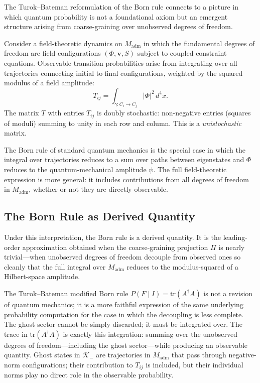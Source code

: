 \documentclass[12pt,a4paper]{article}
\theoremstyle{remark}
\begin{document}
The Turok--Bateman reformulation of the Born rule connects to a picture in
which quantum probability is not a foundational axiom but an emergent
structure arising from coarse-graining over unobserved degrees of freedom.

Consider a field-theoretic dynamics on $M_{\mathrm{adm}}$ in which the
fundamental degrees of freedom are field configurations $(\Phi,\mathbf{v},S)$
subject to coupled constraint equations. Observable transition probabilities
arise from integrating over all trajectories connecting initial to final
configurations, weighted by the squared modulus of a field amplitude:
\begin{equation}
  T_{ij} = \int_{\gamma : C_i \to C_j} |\Phi|^2\,d^4x.
\end{equation}
The matrix $T$ with entries $T_{ij}$ is doubly stochastic: non-negative
entries (squares of moduli) summing to unity in each row and column. This
is a \emph{unistochastic} matrix.

The Born rule of standard quantum mechanics is the special case in which
the integral over trajectories reduces to a sum over paths between
eigenstates and $\Phi$ reduces to the quantum-mechanical amplitude $\psi$.
The full field-theoretic expression is more general: it includes contributions
from all degrees of freedom in $M_{\mathrm{adm}}$, whether or not they are
directly observable.

\subsection{The Born Rule as Derived Quantity}

Under this interpretation, the Born rule is a derived quantity. It is the
leading-order approximation obtained when the coarse-graining projection
$\Pi$ is nearly trivial---when unobserved degrees of freedom decouple from
observed ones so cleanly that the full integral over $M_{\mathrm{adm}}$
reduces to the modulus-squared of a Hilbert-space amplitude.

The Turok--Bateman modified Born rule $P(F\mid I) = \mathrm{tr}(A^\dagger A)$
is not a revision of quantum mechanics; it is a more faithful expression of
the same underlying probability computation for the case in which the
decoupling is less complete. The ghost sector cannot be simply discarded; it
must be integrated over. The trace in $\mathrm{tr}(A^\dagger A)$ is exactly
this integration: summing over the unobserved degrees of freedom---including
the ghost sector---while producing an observable quantity. Ghost states in
$\mathcal{K}_-$ are trajectories in $M_{\mathrm{adm}}$ that pass through
negative-norm configurations; their contribution to $T_{ij}$ is included,
but their individual norms play no direct role in the observable probability.
\end{document}
